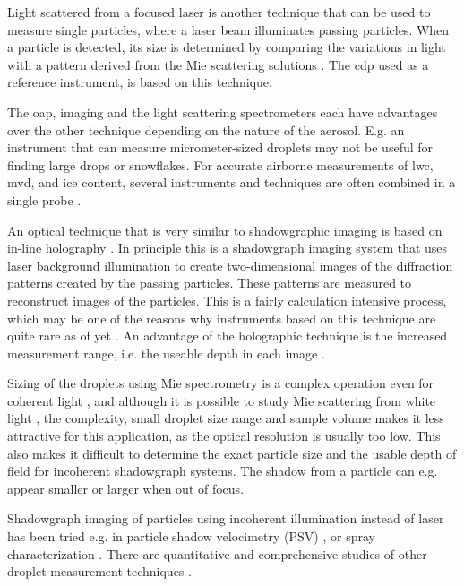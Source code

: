 Light scattered from a focused laser \cite{baum1983,dye1984} is another technique that can be used to measure single particles, where a laser beam illuminates passing particles. When a particle is detected, its size is determined by comparing the variations in light with a pattern derived from the Mie scattering solutions \cite{mie1908}. The \gls{cdp} used as a reference instrument, is based on this technique.

The \gls{oap}, imaging and the light scattering spectrometers each have advantages over the other technique depending on the nature of the aerosol. E.g. an instrument that can measure micrometer-sized droplets may not be useful for finding large drops or snowflakes. For accurate airborne measurements of \gls{lwc}, \gls{mvd}, and ice content, several instruments and techniques are often combined in a single probe \cite{baum2001, baum2011}.

An optical technique that is very similar to shadowgraphic imaging is based on in-line holography \cite{laws1995}. In principle this is a shadowgraph imaging system that uses laser background illumination to create two-dimensional images of the diffraction patterns created by the passing particles. These patterns are measured to reconstruct images of the particles. This is a fairly calculation intensive process, which may be one of the reasons why instruments based on this technique are quite rare as of yet \cite{henn2013}. An advantage of the holographic technique is the increased measurement range, i.e. the useable depth in each image \cite{kaikk2014}.

Sizing of the droplets using Mie spectrometry is a complex operation even for coherent light \cite{bohr2008}, and although it is possible to study Mie scattering from white light \cite{ward2008}, the complexity, small droplet size range and sample volume makes it less attractive for this application, as the optical resolution is usually too low. This also makes it difficult to determine the exact particle size and the usable depth of field for incoherent shadowgraph systems. The shadow from a particle can e.g. appear smaller or larger when out of focus.

Shadowgraph imaging of particles using incoherent illumination instead of laser has been tried e.g. in particle shadow velocimetry (PSV) \cite{este2005}, or spray characterization \cite{will2010}. There are quantitative and comprehensive studies of other droplet measurement techniques \cite{dye1984,henn2013,conno2007}.

